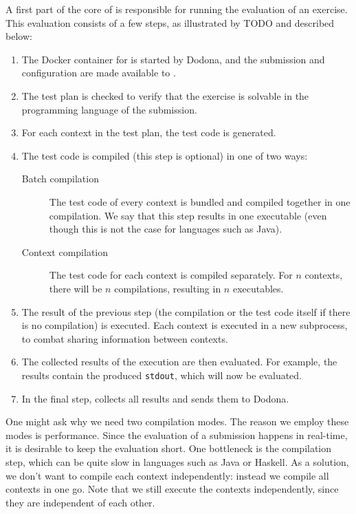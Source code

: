 \documentclass[5p,number]{elsarticle}
\begin{document}
    A first part of the core of \tested{} is responsible for running the evaluation of an exercise.
    This evaluation consists of a few steps, as illustrated by TODO and described below:

    \begin{enumerate}
        \item The Docker container for \tested{} is started by Dodona, and the submission and configuration are made available to \tested{}.
        \item The test plan is checked to verify that the exercise is solvable in the programming language of the submission.
        \item For each context in the test plan, the test code is generated.
        \item The test code is compiled (this step is optional) in one of two ways:
        \begin{description}
            \item[Batch compilation] The test code of every context is bundled and compiled together in one compilation.
            We say that this step results in one executable (even though this is not the case for languages such as Java).
            \item[Context compilation] The test code for each context is compiled separately.
            For $n$ contexts, there will be $n$ compilations, resulting in $n$ executables.
        \end{description}
        \item The result of the previous step (the compilation or the test code itself if there is no compilation) is executed.
        Each context is executed in a new subprocess, to combat sharing information between contexts.
        \item The collected results of the execution are then evaluated.
        For example, the results contain the produced \texttt{stdout}, which will now be evaluated.
        \item In the final step, \tested{} collects all results and sends them to Dodona.
    \end{enumerate}
    
    One might ask why we need two compilation modes.
    The reason we employ these modes is performance.
    Since the evaluation of a submission happens in real-time, it is desirable to keep the evaluation short.
    One bottleneck is the compilation step, which can be quite slow in languages such as Java or Haskell.
    As a solution, we don't want to compile each context independently: instead we compile all contexts in one go.
    Note that we still execute the contexts independently, since they are independent of each other.
\end{document}
